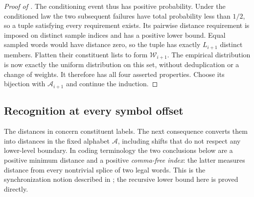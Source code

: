 \begin{proof}[Proof of ]
The conditioning event thus has positive probability.  Under the
conditioned law the two subsequent failures have total probability
less than $1/2$, so a tuple satisfying every requirement exists.
Its pairwise distance requirement is imposed on distinct sample
indices and has a positive lower bound.  Equal sampled words would
have distance zero, so the tuple has exactly $L_{i+1}$ distinct
members.  Flatten their constituent lists to form $\mathcal W_{i+1}$.
The empirical distribution is now exactly the uniform distribution
on this set, without deduplication or a change of weights.
It therefore has all four asserted properties.  Choose its bijection
with $\mathcal A_{i+1}$ and continue the induction.
\end{proof}

\subsection{Recognition at every symbol offset}

The distances in  concern constituent labels.
The next consequence converts them into distances in the fixed
alphabet $\mathcal A$, including shifts that do not respect any
lower-level boundary. In coding terminology the two conclusions below
are a positive minimum distance and a positive \emph{comma-free index}:
the latter measures distance from every nontrivial splice of two legal
words. This is the synchronization notion described in
\cite[\S1]{Tonchev2003}; the recursive lower bound here is proved directly.

